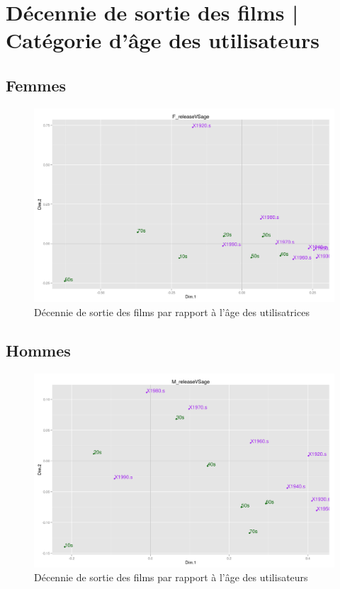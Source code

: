 \section{Décennie de sortie des films | Catégorie d'âge des utilisateurs}
\subsection{Femmes}
\begin{figure}[htd]
\centering
\includegraphics[scale=0.4]{./images/F_releaseVSage}
\caption{Décennie de sortie des films par rapport à l'âge des utilisatrices}
\end{figure}

\subsection{Hommes}
\begin{figure}[htd]
\centering
\includegraphics[scale=0.4]{./images/M_releaseVSage}
\caption{Décennie de sortie des films par rapport à l'âge des utilisateurs}
\end{figure}


